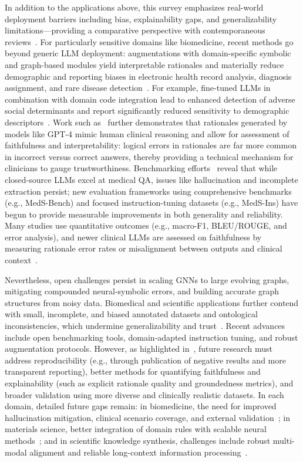 \documentclass[sigconf]{acmart}
\begin{document}
In addition to the applications above, this survey emphasizes real-world deployment barriers including bias, explainability gaps, and generalizability limitations—providing a comparative perspective with contemporaneous reviews~\cite{ref49,ref50,ref53,ref55,ref94,ref95}. For particularly sensitive domains like biomedicine, recent methods go beyond generic LLM deployment: augmentations with domain-specific symbolic and graph-based modules yield interpretable rationales and materially reduce demographic and reporting biases in electronic health record analysis, diagnosis assignment, and rare disease detection~\cite{ref1,ref2,ref3,ref4,ref5,ref15,ref18,ref19,ref36,ref43,ref45,ref47,ref49,ref50,ref53,ref55,ref61,ref62,ref89,ref94,ref95}. For example, fine-tuned LLMs in combination with domain code integration lead to enhanced detection of adverse social determinants and report significantly reduced sensitivity to demographic descriptors~\cite{ref2,ref53}. Work such as~\cite{ref1} further demonstrates that rationales generated by models like GPT-4 mimic human clinical reasoning and allow for assessment of faithfulness and interpretability: logical errors in rationales are far more common in incorrect versus correct answers, thereby providing a technical mechanism for clinicians to gauge trustworthiness. Benchmarking efforts~\cite{ref94,ref95} reveal that while closed-source LLMs excel at medical QA, issues like hallucination and incomplete extraction persist; new evaluation frameworks using comprehensive benchmarks (e.g., MedS-Bench) and focused instruction-tuning datasets (e.g., MedS-Ins) have begun to provide measurable improvements in both generality and reliability. Many studies use quantitative outcomes (e.g., macro-F1, BLEU/ROUGE, and error analysis), and newer clinical LLMs are assessed on faithfulness by measuring rationale error rates or misalignment between outputs and clinical context~\cite{ref1,ref2,ref94,ref95}.

Nevertheless, open challenges persist in scaling GNNs to large evolving graphs, mitigating compounded neural-symbolic errors, and building accurate graph structures from noisy data. Biomedical and scientific applications further contend with small, incomplete, and biased annotated datasets and ontological inconsistencies, which undermine generalizability and trust~\cite{ref36,ref43,ref45,ref53,ref55,ref87,ref94}. Recent advances include open benchmarking tools, domain-adapted instruction tuning, and robust augmentation protocols. However, as highlighted in~\cite{ref61,ref62}, future research must address reproducibility (e.g., through publication of negative results and more transparent reporting), better methods for quantifying faithfulness and explainability (such as explicit rationale quality and groundedness metrics), and broader validation using more diverse and clinically realistic datasets. In each domain, detailed future gaps remain: in biomedicine, the need for improved hallucination mitigation, clinical scenario coverage, and external validation~\cite{ref94,ref95,ref62}; in materials science, better integration of domain rules with scalable neural methods~\cite{ref89}; and in scientific knowledge synthesis, challenges include robust multi-modal alignment and reliable long-context information processing~\cite{ref36,ref80}.
\end{document}
